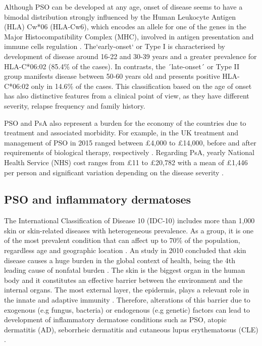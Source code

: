 Although PSO can be developed at any age, onset of disease seems to have a bimodal distribution strongly influenced by the Human Leukocyte Antigen (HLA) Cw*06 (HLA-Cw6), which encodes an allele for one of the genes in the Major Histocompatibility Complex (MHC), involved in antigen presentation and immune cells regulation \parencite{Henseler1985}. The`early-onset` or Type I is characterised by development of disease around 16-22 and 30-39 years and a greater prevalence for HLA-C*06:02 (85.4\% of the cases). In contrasts, the ´late-onset´ or Type II group manifests disease between 50-60 years old and presents positive HLA-C*06:02 only in 14.6\% of the cases. This classification based on the age of onset has also distinctive features from a clinical point of view, as they have different severity, relapse frequency and family history.

PSO and PsA also represent a burden for the economy of the countries due to treatment and associated morbidity. For example, in the UK treatment and management of PSO in 2015 ranged between £4,000 to £14,000, before and after requirements of biological therapy, respectively \parencite{Burgos-Pol2016}. Regarding PsA, yearly National Health Service (NHS) cost ranges from £11 to £20,782 with a mean of £1,446 per person and significant variation depending on the disease severity \parencite{Poole2010}.


\subsection{PSO and inflammatory dermatoses}
%
The International Classification of Disease 10 (IDC-10) includes more than 1,000 skin or skin-related diseases with heterogeneous prevalence. As a group, it is one of the most prevalent condition that can affect up to 70\% of the population, regardless  age and geographic location \parencite{ICD-10}. An study in 2010 concluded that skin disease causes a huge burden in the global context of health, being the 4th leading cause of nonfatal burden \parencite{Roderick2014}. The skin is the biggest organ in the human body and it constitutes an effective barrier between the environment and the internal organs. The most external layer, the epidermis, plays a relevant role in the innate and adaptive immunity \parencite{Proksch2008}. Therefore, alterations of this barrier due to exogenous (e.g fungus, bacteria) or endogenous (e.g genetic) factors can lead to development of inflammatory dermatose conditions such as PSO, atopic dermatitis (AD), seborrheic dermatitis and cutaneous lupus erythematosus (CLE) \parencite{Johnson-Huang,2009}. 

